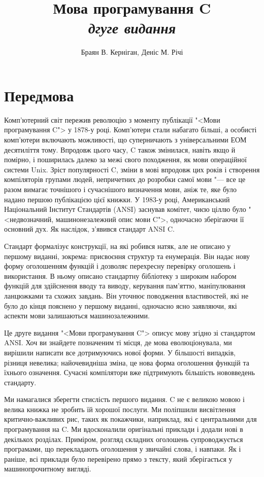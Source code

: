 \documentclass[a4paper,12pt]{book}
\title{Мова програмування C\\
       \textit{\small{дгуге видання}}}
\author{Браян В. Керніган, Деніс М. Річі}
\date{}  %
\begin{document}

\maketitle
\tableofcontents


\frontmatter
\chapter{Передмова}


  Комп'ютерний світ пережив революцію з моменту публікації "<Мови програмування
  C"> у 1878-у році. Комп'ютери стали набагато більші, а особисті комп'ютери
  включають можливості, що суперничають з універсальними ЕОМ десятиліття тому. Впродовж
  цього часу, C також змінилася, навіть якщо й помірно, і поширилась далеко за межі свого
  походження, як мови операційної системи Unix. Зріст популярності C, зміни в мові
  впродовж цих років і створення компіляторів групами людей, непричетних до розробки самої
  мови "--- все це разом вимагає точнішого і сучаснішого визначення мови, аніж те, яке
  було надано першою публікацією цієї книжки. У 1983-у році, Американський Національний
  Інститут Стандартів (ANSI) заснував комітет, чиєю ціллю було "<недвозначний,
  машинонезалежний опис мови C">, одночасно зберігаючи її основний дух. Як наслідок,
  з'явився стандарт ANSI C.

  Стандарт формалізує конструкції, на які робився натяк, але не описано у першому
  виданні, зокрема: присвоєння структур та енумерація. Він надає нову форму оголошенням
  функцій і дозволяє перехресну перевірку оголошень і використання. В ньому описано
  стандартну бібліотеку з широким набором функцій для здійснення вводу та виводу,
  керування пам'яттю, маніпулювання ланцюжками та схожих завдань. Він уточнює
  поводження властивостей, які не було до кінця пояснено у першому виданні, одночасно
  ясно заявляючи, які аспекти мови залишаються машинозалежними.

  Це друге видання "<Мови програмування C"> описує мову згідно зі стандартом ANSI. Хоч
  ви знайдете позначеним ті місця, де мова еволюціонувала, ми вирішили написати все
  дотримуючись нової форми. У більшості випадків, різниця невелика; найочевидніша зміна,
  це нова форма оголошення функцій та їхнього означення. Сучасні компілятори вже
  підтримують більшість нововведень стандарту.

  Ми намагалися зберегти стислість першого видання. C не є великою мовою і велика
  книжка не зробить їй хорошої послуги. Ми поліпшили висвітлення критично-важливих рис,
  таких як покажчики, наприклад, які є центральними для програмування на C. Ми
  вдосконалили оригінальні приклади і додали нові в декількох розділах. Приміром, розгляд
  складних оголошень супроводжується програмами, що перекладають оголошення у звичайні
  слова, і навпаки. Як і раніше, всі приклади було перевірено прямо з тексту, який
  зберігається у машинопрочитному вигляді.
\end{document}
